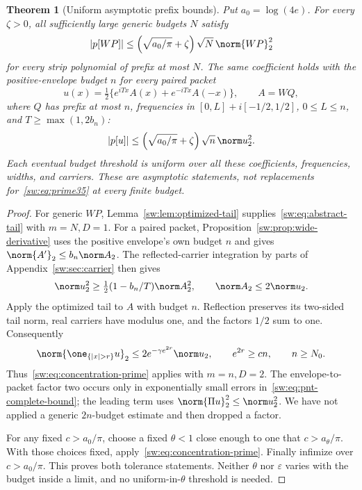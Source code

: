 \documentclass[11pt,a4paper]{article}
\numberwithin{equation}{section}
\newtheorem{theorem}{Theorem}[section]
\theoremstyle{definition}\newtheorem{definition}[theorem]{Definition}
\theoremstyle{remark}\newtheorem{remark}[theorem]{Remark}
\begin{document}
\begin{theorem}[Uniform asymptotic prefix bounds]\label{sw:thm:pnt-prime}
Put $a_0=\log(4e)$. For every $\zeta>0$, all sufficiently large generic budgets $N$ satisfy
\begin{equation}\label{sw:eq:pnt-generic}
 |p[WP]|\le\left(\sqrt{a_0/\pi}+\zeta\right)\sqrt N\,\norm{WP}_2^2
\end{equation}
for every strip polynomial of prefix at most $N$. The same coefficient holds with the positive-envelope budget $n$ for every paired packet
\begin{equation}\label{sw:eq:positive-budget-packet}
 u(x)=\tfrac12\{e^{iTx}A(x)+e^{-iTx}A(-x)\},\qquad A=WQ,
\end{equation}
where $Q$ has prefix at most $n$, frequencies in $[0,L]+i[-1/2,1/2]$,
$0\le L\le n$, and $T\ge\max(1,2b_n)$:
\begin{equation}\label{sw:eq:pnt-paired}
 |p[u]|\le\left(\sqrt{a_0/\pi}+\zeta\right)\sqrt n\,\norm u_2^2.
\end{equation}
Each eventual budget threshold is uniform over all these coefficients, frequencies, widths, and carriers. These are asymptotic statements, not replacements for~\eqref{sw:eq:prime35} at every finite budget.
\end{theorem}
\begin{proof}
For generic $WP$, Lemma~\ref{sw:lem:optimized-tail} supplies~\eqref{sw:eq:abstract-tail} with $m=N,D=1$. For a paired packet, Proposition~\ref{sw:prop:wide-derivative} uses the positive envelope's own budget $n$ and gives $\norm{A'}_2\le b_n\norm A_2$. The reflected-carrier integration by parts of Appendix~\ref{sw:sec:carrier} then gives
\[
 \norm u_2^2\ge\tfrac12(1-b_n/T)\norm A_2^2,
 \qquad \norm A_2\le2\norm u_2.
\]
Apply the optimized tail to $A$ with budget $n$. Reflection preserves its two-sided tail norm, real carriers have modulus one, and the factors $1/2$ sum to one. Consequently
\[
 \norm{\one_{\{|x|>r\}}u}_2
 \le2e^{-\gamma e^{2r}}\norm u_2,
 \qquad e^{2r}\ge cn,\qquad n\ge N_0.
\]
Thus~\eqref{sw:eq:concentration-prime} applies with $m=n,D=2$. The envelope-to-packet factor two occurs only in exponentially small errors in~\eqref{sw:eq:pnt-complete-bound}; the leading term uses $\norm{\Pi u}_2^2\le\norm u_2^2$. We have not applied a generic $2n$-budget estimate and then dropped a factor.

For any fixed $c>a_0/\pi$, choose a fixed $\theta<1$ close enough to one that $c>a_\theta/\pi$. With those choices fixed, apply~\eqref{sw:eq:concentration-prime}. Finally infimize over $c>a_0/\pi$. This proves both tolerance statements. Neither $\theta$ nor $\varepsilon$ varies with the budget inside a limit, and no uniform-in-$\theta$ threshold is needed.
\end{proof}
\end{document}
